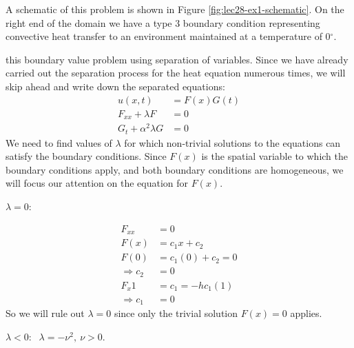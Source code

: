 \vspace{0.1cm}

\noindent A schematic of this problem is shown in Figure \ref{fig:lec28-ex1-schematic}.  On the right end of the domain we have a type 3 boundary condition representing convective heat transfer to an environment maintained at a temperature of 0$^{\circ}$.

\vspace{4.0cm}

 this boundary value problem using separation of variables.  Since we have already carried out the separation process for the heat equation numerous times, we will skip ahead and write down the separated equations:
\begin{align*}
u(x,t) &= F(x)G(t) \\
F_{xx} + \lambda F &= 0 \\
G_{t} + \alpha^2 \lambda G &= 0 
\end{align*}
We need to find values of $\lambda$ for which non-trivial solutions to the equations can satisfy the boundary conditions.  Since $F(x)$ is the spatial variable to which the boundary conditions apply, and both boundary conditions are homogeneous, we will focus our attention on the equation for $F(x)$.

\vspace{0.25cm}

\noindent \underline{$\lambda = 0$}:

\begin{align*}
F_{xx} &= 0 \\
F(x) &= c_1x + c_2 \\
F(0) &= c_1(0) + c_2 = 0 \\
\Rightarrow c_2 &= 0 \\
F_x{1} &= c_1 = -hc_1(1) \\
\Rightarrow c_1&= 0
\end{align*} So we will rule out $\lambda=0$ since only the trivial solution $F(x)=0$ applies.

\vspace{0.25cm}

\noindent \underline{$\lambda < 0$}:  $\ \ \lambda = -\nu^2, \ \nu>0$.

